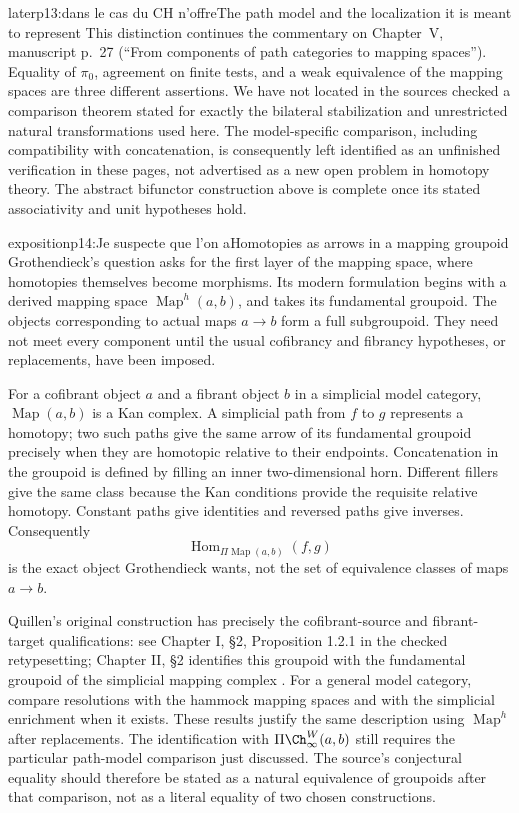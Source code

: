 \begin{dcomment}{later}{p13:dans le cas du CH n'offre}{The path model and the localization it is meant to represent}
This distinction continues the commentary on Chapter~V, manuscript p.~27 (``From components of path categories to mapping spaces''). Equality of $\pi_0$, agreement on finite tests, and a weak equivalence of the mapping spaces are three different assertions. We have not located in the sources checked a comparison theorem stated for exactly the bilateral stabilization and unrestricted natural transformations used here. The model-specific comparison, including compatibility with concatenation, is consequently left identified as an unfinished verification in these pages, not advertised as a new open problem in homotopy theory. The abstract bifunctor construction above is complete once its stated associativity and unit hypotheses hold.
\end{dcomment}

\begin{dcomment}{exposition}{p14:Je suspecte que l'on a}{Homotopies as arrows in a mapping groupoid}
Grothendieck's question asks for the first layer of the mapping space, where homotopies themselves become morphisms. Its modern formulation begins with a derived mapping space $\operatorname{Map}^{h}(a,b)$, and takes its fundamental groupoid. The objects corresponding to actual maps $a\to b$ form a full subgroupoid. They need not meet every component until the usual cofibrancy and fibrancy hypotheses, or replacements, have been imposed.

For a cofibrant object $a$ and a fibrant object $b$ in a simplicial model category, $\operatorname{Map}(a,b)$ is a Kan complex. A simplicial path from $f$ to $g$ represents a homotopy; two such paths give the same arrow of its fundamental groupoid precisely when they are homotopic relative to their endpoints. Concatenation in the groupoid is defined by filling an inner two-dimensional horn. Different fillers give the same class because the Kan conditions provide the requisite relative homotopy. Constant paths give identities and reversed paths give inverses. Consequently
\[
 \operatorname{Hom}_{\Pi\operatorname{Map}(a,b)}(f,g)
\]
is the exact object Grothendieck wants, not the set of equivalence classes of maps $a\to b$.

Quillen's original construction has precisely the cofibrant-source and fibrant-target qualifications: see Chapter I, \S2, Proposition 1.2.1 in the checked retypesetting; Chapter II, \S2 identifies this groupoid with the fundamental groupoid of the simplicial mapping complex \citep{Quillen1967}. For a general model category, \citet[Propositions 4.4--4.5 and 4.8]{DwyerKan1980Function} compare resolutions with the hammock mapping spaces and with the simplicial enrichment when it exists. These results justify the same description using $\operatorname{Map}^{h}$ after replacements. The identification with $\Pi\Ch^W_\infty(a,b)$ still requires the particular path-model comparison just discussed. The source's conjectural equality should therefore be stated as a natural equivalence of groupoids after that comparison, not as a literal equality of two chosen constructions.
\end{dcomment}

